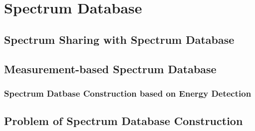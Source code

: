\chapter[Spectrum Database]{Spectrum Database}
\label{chapter:Database}

\section{Spectrum Sharing with Spectrum Database}

\section{Measurement-based Spectrum Database}
    \subsection{Spectrum Datbase Construction based on Energy Detection}

\section{Problem of Spectrum Database Construction }

